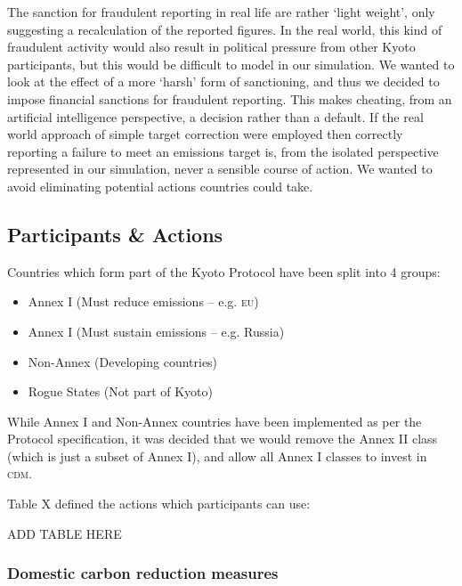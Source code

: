 \begin{description}
The sanction for fraudulent reporting in real life are rather `light weight', only suggesting a recalculation of the reported figures. In the real world, this kind of fraudulent activity would also result in political pressure from other Kyoto participants, but this would be difficult to model in our simulation. We wanted to look at the effect of a more `harsh' form of sanctioning, and thus we decided to impose financial sanctions for fraudulent reporting. This makes cheating, from an artificial intelligence perspective, a decision rather than a default. If the real world approach of simple target correction were employed then correctly reporting a failure to meet an emissions target is, from the isolated perspective represented in our simulation, never a sensible course of action. We wanted to avoid eliminating potential actions countries could take.
\end{description}

\subsection{Participants \& Actions}
Countries which form part of the Kyoto Protocol have been split into 4 groups:

\begin{itemize}
	\item{Annex I (Must reduce emissions -- e.g. \textsc{eu})}
	\item{Annex I (Must sustain emissions -- e.g. Russia)}
	\item{Non-Annex (Developing countries)}
	\item{Rogue States (Not part of Kyoto)}
\end{itemize}

While Annex I and Non-Annex countries have been implemented as per the Protocol specification, it was decided that we would remove the Annex II class (which is just a subset of Annex I), and allow all Annex I classes to invest in \textsc{cdm}.

Table X defined the actions which participants can use:

\begin{center}
ADD TABLE HERE
\end{center}

\subsubsection{Domestic carbon reduction measures}

